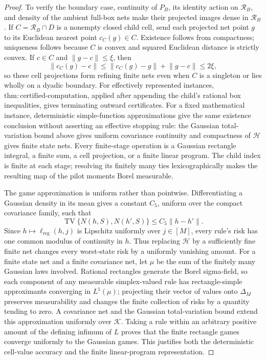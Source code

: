 \documentclass{article}
\begin{document}
\begin{proof}
To verify the boundary case, continuity of \(P_B\), its identity action on \(\mathcal R_B\), and density of the ambient full-box nets make their projected images dense in \(\mathcal R_B\). If \(C=\mathcal R_B\cap D\) is a nonempty closed child cell, send each projected net point \(g\) to its Euclidean nearest point \(c_C(g)\in C\). Existence follows from compactness; uniqueness follows because \(C\) is convex and squared Euclidean distance is strictly convex. If \(c\in C\) and \(\lVert g-c\rVert\le\xi\), then
\[
\lVert c_C(g)-c\rVert
\le\lVert c_C(g)-g\rVert+\lVert g-c\rVert\le2\xi,
\]
so these cell projections form refining finite nets even when \(C\) is a singleton or lies wholly on a dyadic boundary. For effectively represented instances, \(\mathrm{thm:certified\text{-}computation}\), applied after appending the child's rational box inequalities, gives terminating outward certificates. For a fixed mathematical instance, deterministic simple-function approximations give the same existence conclusion without asserting an effective stopping rule: the Gaussian total-variation bound above gives uniform covariance continuity and compactness of \(\mathcal H\) gives finite state nets. Every finite-stage operation is a Gaussian rectangle integral, a finite sum, a cell projection, or a finite linear program. The child index is finite at each stage; resolving its finitely many ties lexicographically makes the resulting map of the pilot moments Borel measurable.

The game approximation is uniform rather than pointwise. Differentiating a Gaussian density in its mean gives a constant \(C_5\), uniform over the compact covariance family, such that
\[
\operatorname{TV}\{N(h,S),N(h',S)\}\le C_5\lVert h-h'\rVert.
\]
Since \(h\mapsto\ell_{\mathrm{reg}}(h,j)\) is Lipschitz uniformly over \(j\in[M]\), every rule's risk has one common modulus of continuity in \(h\). Thus replacing \(\mathcal H\) by a sufficiently fine finite net changes every worst-state risk by a uniformly vanishing amount. For a finite state net and a finite covariance net, let \(\mu\) be the sum of the finitely many Gaussian laws involved. Rational rectangles generate the Borel sigma-field, so each component of any measurable simplex-valued rule has rectangle-simple approximants converging in \(L^1(\mu)\); projecting their vector of values onto \(\Delta_M\) preserves measurability and changes the finite collection of risks by a quantity tending to zero. A covariance net and the Gaussian total-variation bound extend this approximation uniformly over \(\mathcal K\). Taking a rule within an arbitrary positive amount of the defining infimum of \(L\) proves that the finite rectangle games converge uniformly to the Gaussian games. This justifies both the deterministic cell-value accuracy and the finite linear-program representation.


\end{proof}
\end{document}

